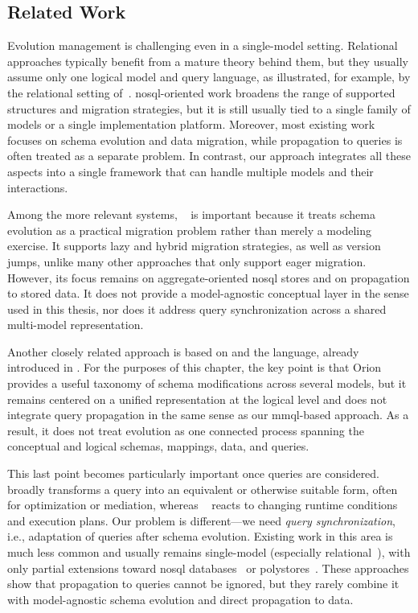 \subsection{Related Work}
\label{sec:evolution-related-work}

Evolution management is challenging even in a single-model setting. Relational approaches typically benefit from a mature theory behind them, but they usually assume only one logical model and query language, as illustrated, for example, by the relational setting of~\citep{spivak2015relational}. \acrshort{nosql}-oriented work broadens the range of supported structures and migration strategies, but it is still usually tied to a single family of models or a single implementation platform. Moreover, most existing work focuses on schema evolution and data migration, while propagation to queries is often treated as a separate problem. In contrast, our approach integrates all these aspects into a single framework that can handle multiple models and their interactions.

Among the more relevant systems, ~\citep{storl2022darwin} is important because it treats schema evolution as a practical migration problem rather than merely a modeling exercise. It supports lazy and hybrid migration strategies, as well as version jumps, unlike many other approaches that only support eager migration. However, its focus remains on aggregate-oriented \acrshort{nosql} stores and on propagation to stored data. It does not provide a model-agnostic conceptual layer in the sense used in this thesis, nor does it address query synchronization across a shared multi-model representation.

Another closely related approach is based on  and the  language, already introduced in . For the purposes of this chapter, the key point is that Orion provides a useful taxonomy of schema modifications across several models, but it remains centered on a unified representation at the logical level and does not integrate query propagation in the same sense as our \acrshort{mmql}-based approach. As a result, it does not treat evolution as one connected process spanning the conceptual and logical schemas, mappings, data, and queries.

This last point becomes particularly important once queries are considered. ~\citep{10.1007/s00778-021-00676-3} broadly transforms a query into an equivalent or otherwise suitable form, often for optimization or mediation, whereas ~\citep{10.5555/1331939.1331940} reacts to changing runtime conditions and execution plans. Our problem is different---we need \emph{query synchronization}, i.e., adaptation of queries after schema evolution. Existing work in this area is much less common and usually remains single-model (especially relational~\citep{10.14778/1921071.1921078}), with only partial extensions toward \acrshort{nosql} databases~\citep{DBLP:conf/er/MollerKHS19} or polystores~\citep{9252014}. These approaches show that propagation to queries cannot be ignored, but they rarely combine it with model-agnostic schema evolution and direct propagation to data.

